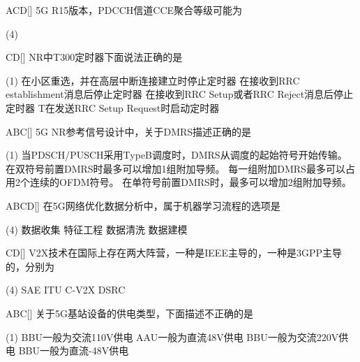 \begin{choice}{\;ACD\;}[]
    5G R15版本，PDCCH信道CCE聚合等级可能为
    \begin{tasks}(4)
    \end{tasks}
\end{choice}

\begin{choice}{\;CD\;}[]
    NR中T300定时器下面说法正确的是
    \begin{tasks}(1)
        \task 在小区重选，并在高层中断连接建立时停止定时器
        \task 在接收到RRC establishment消息后停止定时器
        \task 在接收到RRC Setup或者RRC Reject消息后停止定时器
        \task T在发送RRC Setup Request时启动定时器
    \end{tasks}
\end{choice}

\begin{choice}{\;ABC\;}[]
    5G NR参考信号设计中，关于DMRS描述正确的是
    \begin{tasks}(1)
        \task 当PDSCH/PUSCH采用TypeB调度时，DMRS从调度的起始符号开始传输。
        \task 在双符号前置DMRS时最多可以增加1组附加导频。
        \task 每一组附加DMRS最多可以占用2个连续的OFDM符号。
        \task 在单符号前置DMRS时，最多可以增加2组附加导频。
    \end{tasks}
\end{choice}


\begin{choice}{\;ABCD\;}[]
    在5G网络优化数据分析中，属于机器学习流程的选项是
    \begin{tasks}(4)
        \task 数据收集
        \task 特征工程
        \task 数据清洗
        \task 数据建模
    \end{tasks}
\end{choice}


\begin{choice}{\;CD\;}[]
    V2X技术在国际上存在两大阵营，一种是IEEE主导的，一种是3GPP主导的，分别为
    \begin{tasks}(4)
        \task SAE
        \task ITU
        \task C-V2X
        \task DSRC
    \end{tasks}
\end{choice}


\begin{choice}{\;ABC\;}[]
    关于5G基站设备的供电类型，下面描述不正确的是
    \begin{tasks}(1)
        \task BBU一般为交流110V供电
        \task AAU一般为直流48V供电
        \task BBU一般为交流220V供电
        \task BBU一般为直流-48V供电
    \end{tasks}
\end{choice}

